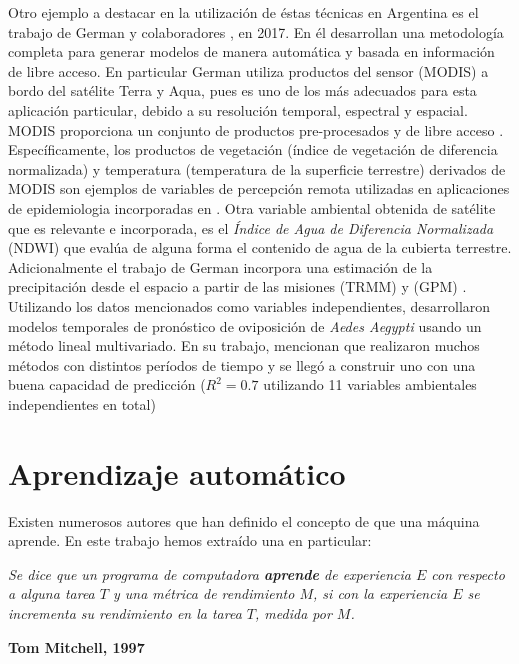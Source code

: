 \par Otro ejemplo a destacar en la utilización de éstas técnicas en Argentina es
  el trabajo de German y colaboradores \cite{german_temporal}, en 2017.
  En él desarrollan una metodología completa
  para generar modelos de manera automática y basada en información de libre
  acceso. En particular German \cite{german_temporal} utiliza productos del sensor (MODIS) a bordo
  del satélite Terra y Aqua, pues es uno de los más adecuados para esta
  aplicación particular, debido a su resolución temporal, espectral y espacial.
  MODIS proporciona un conjunto de productos pre-procesados y de libre acceso \cite{terra_aqua_modis}.
  Específicamente, los productos de vegetación (índice de vegetación de diferencia
  normalizada) y temperatura (temperatura de la superficie terrestre) derivados
  de MODIS son ejemplos de variables de percepción remota utilizadas
  en aplicaciones de epidemiologia \cite{porcasi_operative, butt_use_modis}
  incorporadas en \cite{german_temporal}. Otra variable
  ambiental obtenida de satélite que es relevante e incorporada, es el
  \textit{Índice de Agua de Diferencia Normalizada} (NDWI) que evalúa de alguna
  forma el contenido de agua de la cubierta terrestre. Adicionalmente el trabajo de German
  incorpora una estimación de la precipitación desde el espacio a partir de las
  misiones (TRMM) y (GPM) \cite{trmm_mision}.
  Utilizando los datos mencionados como variables independientes,
  desarrollaron modelos temporales de pronóstico de oviposición de \textit{Aedes Aegypti}
  usando un método lineal multivariado. En su trabajo, mencionan que
  realizaron muchos métodos con distintos períodos de tiempo y se llegó a
  construir uno con una buena capacidad de
  predicción ($R^{2} = 0.7 $ utilizando 11 variables ambientales independientes en total)


  \section{Aprendizaje automático}

    \par Existen numerosos autores que han definido el concepto de que una máquina
      aprende. En este trabajo hemos extraído una en particular:
      \begin{framed}
        \begin{center}
          \textit{Se dice que un programa de computadora \textbf{aprende} de experiencia
          $E$ con respecto a alguna tarea $T$ y una métrica de rendimiento $M$, si
          con la experiencia $E$ se incrementa su rendimiento en la tarea $T$,
          medida por $M$.}\\
        \end{center}
        \centering \textbf{Tom Mitchell, 1997} \cite{mitchell_learn}
      \end{framed}

